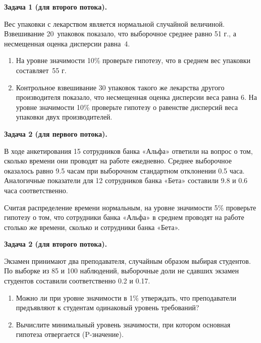 \documentclass[12pt, a4paper]{article}\usepackage[]{graphicx}\usepackage[]{color}
\begin{document}
				\vspace{0.5cm}

				\textbf{Задача 1 (для второго потока).}

				Вес упаковки с лекарством является нормальной случайной величиной. Взвешивание 20~упаковок показало, что выборочное среднее равно 51 г., а  несмещенная оценка дисперсии равна~4.
				\begin{enumerate}
					\item На уровне значимости 10\% проверьте гипотезу, что в среднем вес упаковки составляет~55 г.
					\item Контрольное взвешивание 30 упаковок такого же лекарства другого производителя показало, что несмещенная оценка дисперсии веса равна 6. На уровне значимости 10\% проверьте гипотезу о равенстве дисперсий веса упаковки двух производителей.
				\end{enumerate}

				\vspace{0.5cm}

				\textbf{Задача 2 (для первого потока).}

				В ходе анкетирования  15 сотрудников банка «Альфа» ответили на вопрос о том, сколько времени они проводят на работе ежедневно. Среднее выборочное оказалось равно 9.5 часам при выборочном стандартном отклонении 0.5 часа. Аналогичные показатели для 12 сотрудников банка «Бета» составили 9.8 и 0.6 часа соответственно.

				Считая распределение времени нормальным, на уровне значимости 5\% проверьте гипотезу о том, что сотрудники банка «Альфа» в среднем проводят на работе столько же времени, сколько и сотрудники банка «Бета».

				\vspace{0.5cm}

				\textbf{Задача 2 (для второго потока).}

				Экзамен принимают два преподавателя, случайным образом выбирая студентов. По выборке из 85 и 100 наблюдений, выборочные доли не сдавших экзамен студентов составили соответственно 0.2  и 0.17.
				\begin{enumerate}
					\item Можно ли при уровне значимости в 1\% утверждать, что преподаватели предъявляют к студентам одинаковый уровень требований?
					\item Вычислите минимальный уровень значимости, при котором основная гипотеза отвергается (P-значение).
				\end{enumerate}
\end{document}

